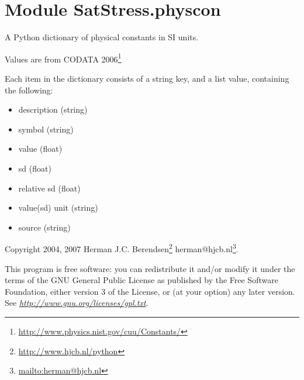 %
%
%


\section{Module SatStress.physcon}

    \label{SatStress:physcon}
A Python dictionary of physical constants in SI units.

Values are from CODATA 
2006\footnote{\href{http://www.physics.nist.gov/cuu/Constants/}{http://www.physics.nist.gov/cuu/Constants/}}

Each item in the dictionary consists of a string key, and a list value, 
containing the following:

\begin{itemize}
\setlength{\parskip}{0.6ex}
  \item description (string)

  \item symbol (string)

  \item value (float)

  \item sd (float)

  \item relative sd (float)

  \item value(sd) unit (string)

  \item source (string)

\end{itemize}

Copyright 2004, 2007 Herman J.C. 
Berendsen\footnote{\href{http://www.hjcb.nl/python}{http://www.hjcb.nl/python}}
herman@hjcb.nl\footnote{\href{mailto:herman@hjcb.nl}{mailto:herman@hjcb.nl}}.

This program is free software: you can redistribute it and/or modify it 
under the terms of the GNU General Public License as published by the Free 
Software Foundation, either version 3 of the License, or (at your option) 
any later version. See 
\href{http://www.gnu.org/licenses/gpl.txt}{\textit{http://www.gnu.org/licenses/gpl.txt}}.

